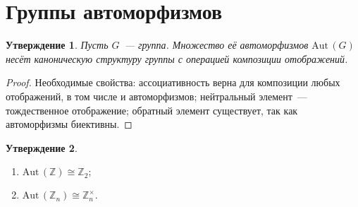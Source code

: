 \documentclass[a4paper, 14pt]{extarticle}
\newcommand{\integers}{\mathbb{Z}}
\newcommand{\Aut}{\mathrm{Aut} \,}
\theoremstyle{definition}
\theoremstyle{plain}
\numberwithin{theorem}{section}
\numberwithin{definition}{section}
\newtheorem{statement}{Утверждение}
\numberwithin{statement}{section}
\numberwithin{lemma}{section}
\numberwithin{consequence}{section}
\begin{document}
        \section{Группы автоморфизмов}
        \begin{statement}
            Пусть $G$~--- группа. \textit{Множество её автоморфизмов} $\Aut(G)$ несёт каноническую структуру группы с операцией композиции отображений.
        \end{statement}
        \begin{proof}
            Необходимые свойства: ассоциативность верна для композиции любых отображений, в том числе и автоморфизмов; нейтральный элемент~--- тождественное отображение; обратный элемент существует, так как автоморфизмы биективны.
        \end{proof}
        \begin{statement}
            \
            \begin{enumerate}
            \setlength\itemsep{0.1em}
                \item ${\Aut(\integers) \cong \integers_2;}$
                \item ${\Aut(\integers_n) \cong \integers^\times_n.}$
            \end{enumerate}
        \end{statement}
\end{document}
